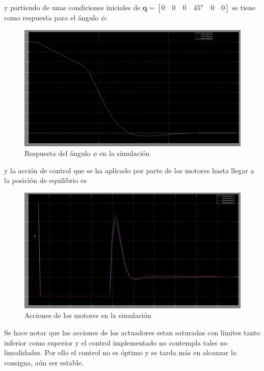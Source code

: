 \documentclass[twoside,11pt]{report}
\begin{document}
y partiendo de unas condiciones iniciales de $\mathbf{q}=[0 \quad 0 \quad 0 \quad 45^{o} \quad 0 \quad 0 ]$ se tiene como respuesta para el ángulo $\phi$: 

\begin{figure}[h!]
\begin{center}
\includegraphics[scale=0.25]{images/simulation_1.jpeg}
\end{center}
\caption{Respuesta del ángulo $\phi$ en la simulación}
\end{figure}


y la acción de control que se ha aplicado por parte de los motores hasta llegar a la posición de equilibrio es

\begin{figure}[h!]
\begin{center}
\includegraphics[scale=0.25]{images/simulation_2.jpeg}
\end{center}
\caption{Acciones de los motores en la simulación}
\end{figure}

Se hace notar que las acciones de los actuadores estan saturadas con límites tanto inferior como superior y el control implementado no contempla tales no linealidades. Por ello el control no es óptimo y se tarda más en alcanzar la consigna, aún ser estable.
	
\end{document}
